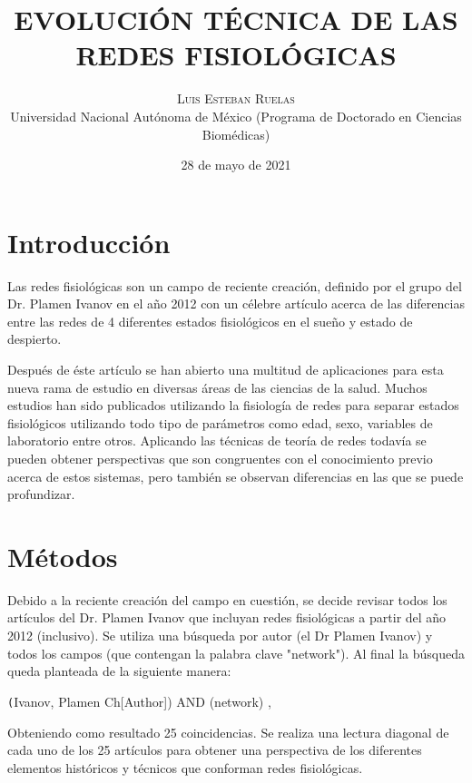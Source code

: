 \documentclass[twoside,twocolumn]{article}
\title{EVOLUCIÓN TÉCNICA DE LAS REDES FISIOLÓGICAS} %
\author{%
\textsc{Luis Esteban Ruelas} \\[1ex] %
\normalsize Universidad Nacional Autónoma de México
 (Programa de Doctorado en Ciencias Biomédicas)\\ %
}
\date{28 de mayo de 2021} %
\begin{document}
\renewcommand{\abstractname}{Resumen}
\maketitle


\section{Introducción}
Las redes fisiológicas son un campo de reciente creación, definido por el grupo del Dr. Plamen Ivanov en el año 2012 con un célebre artículo acerca de las diferencias entre las redes de 4 diferentes estados fisiológicos en el sueño y estado de despierto\cite{bartsch2014coexisting}.

Después de éste artículo se han abierto una multitud de aplicaciones para esta nueva rama de estudio en diversas áreas de las ciencias de la salud.
Muchos estudios han sido publicados utilizando la fisiología de redes para separar estados fisiológicos utilizando todo tipo de parámetros como edad, sexo, variables de laboratorio entre otros.
Aplicando las técnicas de teoría de redes todavía se pueden obtener perspectivas que son congruentes con el conocimiento previo acerca de estos sistemas, pero también se observan diferencias en las que se puede profundizar.

\section{Métodos}
Debido a la reciente creación del campo en cuestión, se decide revisar todos los artículos del Dr. Plamen Ivanov que incluyan redes fisiológicas a partir del año 2012 (inclusivo).
Se utiliza una búsqueda por autor (el Dr Plamen Ivanov) y todos los campos (que contengan la palabra clave "network"). Al final la búsqueda queda planteada de la siguiente manera:

\texttt(Ivanov, Plamen Ch[Author]) AND (network) ,

Obteniendo como resultado 25 coincidencias. Se realiza una lectura diagonal de cada uno de los 25 artículos para obtener una perspectiva de los diferentes elementos históricos y técnicos que conforman redes fisiológicas.
\end{document}

